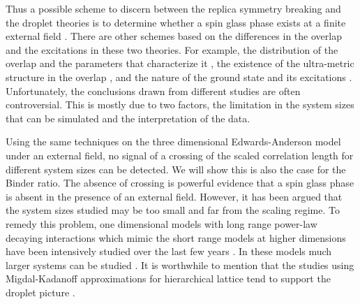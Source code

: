 Thus a possible scheme to discern between the replica symmetry breaking and the droplet theories is to determine
whether a spin glass phase exists at a finite external field \cite{Young-Katzgraber2004}. 
There are other schemes based on the differences in the overlap and the excitations in these two theories. 
For example, the distribution of the overlap and the parameters that characterize it \cite{Hatano-Gubernatis-2002, 
Marinari-etal-1998,Marinari-etal-1999,Bokil-etal-1999,Moore-etal-1998,Monthus-Garel-2013}, 
the existence of the ultra-metric structure in the overlap \cite{Hed-Young-Domany-2004,Contucci-etal-2007}, 
and the nature of the ground state and its 
excitations \cite{Palassini-Young-2000a,Palassini-Young-2000b,Aspelmeier-Moore-Young-2003,Marinari-Parisi-2001,
Houdayer-Martin-1999,Marinari-Parisi-Zuliani-2000,Marinari-etal-1999}.
Unfortunately, the conclusions drawn from different studies are often controversial.  
This is mostly due to two factors, the limitation in the system sizes that can be 
simulated and the interpretation of the data. 

Using the same techniques on the three dimensional Edwards-Anderson model under an external field, no signal of 
a crossing of the scaled correlation length for different system sizes can be 
detected\cite{Young-Katzgraber2004}.  We will show this is also 
the case for the Binder ratio.  The absence of crossing is powerful evidence that a spin
glass phase is absent in the presence of an external field. However, it has been 
argued that the system sizes studied may be too small and far from the scaling 
regime. To remedy this problem, one dimensional models with long range power-law 
decaying interactions \cite{Kotliar-Anderson-Stein-1983} which mimic the short range models 
at higher dimensions have been intensively studied over the last few years \cite{Katzgraber-Young-2003a,Katzgraber-Young-2003b,
Leuzzi-1999}. In these models much larger systems can be studied \cite{Katzgraber-Larson-Young-2009,
Katzgraber-Hartmann-2009,Leuzzi-etal-2008,Larson-etal-2013}. It is worthwhile to mention that
the studies using Migdal-Kadanoff approximations for hierarchical lattice
tend to support the droplet picture \cite{Moore-Bokil-Drossel-1998,Migliorini-Berker-1998}. 

